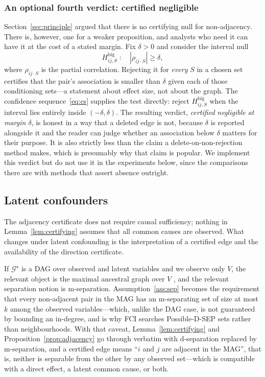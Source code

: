 \documentclass[pdflatex,sn-apa]{sn-jnl}
\theoremstyle{thmstyleone}%
\theoremstyle{thmstyletwo}%
\theoremstyle{thmstylethree}%
\newcommand{\Gstar}{\mathcal{G}^{\star}}
\begin{document}
\subsubsection{An optional fourth verdict: certified negligible}
\label{sec:negligible}

Section~\ref{sec:principle} argued that there is no certifying null for
non-adjacency. There is, however, one for a weaker proposition, and analysts
who need it can have it at the cost of a stated margin. Fix $\delta > 0$ and
consider the interval null
\begin{equation}\label{eq:ropenull}
H^{\mathrm{big}}_{ij,S} \;:\quad |\rho_{ij \cdot S}| \ge \delta ,
\end{equation}
where $\rho_{ij\cdot S}$ is the partial correlation. Rejecting it for
\emph{every} $S$ in a chosen set certifies that the pair's association is
smaller than $\delta$ given each of those conditioning sets---a statement
about effect size, not about the graph. The confidence
sequence~\eqref{eq:cs} supplies the test directly: reject $H^{\mathrm{big}}_{ij,S}$
when the interval lies entirely inside $(-\delta, \delta)$. The resulting verdict, \emph{certified
negligible at margin $\delta$}, is honest in a way that a deleted edge is not,
because $\delta$ is reported alongside it and the reader can judge whether an
association below $\delta$ matters for their purpose. It is also strictly less
than the claim a delete-on-non-rejection method makes, which is presumably why
that claim is popular. We implement this verdict but do not use it in the
experiments below, since the comparisons there are with methods that assert
absence outright.

\subsection{Latent confounders}\label{sec:latent}

The adjacency certificate does not require causal sufficiency; nothing in
Lemma~\ref{lem:certifying} assumes that all common causes are observed.
What changes under latent confounding is the interpretation of a certified
edge and the availability of the direction certificate.

If $\Gstar$ is a DAG over observed and latent variables and we observe only
$V$, the relevant object is the maximal ancestral graph over $V$
\citep{richardson2002ancestral}, and the relevant separation notion is
m-separation. Assumption~\ref{ass:sep} becomes the requirement that every
non-adjacent pair in the MAG has an m-separating set of size at most $k$ among
the observed variables---which, unlike the DAG case, is not guaranteed by
bounding an in-degree, and is why FCI searches Possible-D-SEP sets rather than
neighbourhoods. With that caveat, Lemma~\ref{lem:certifying} and
Proposition~\ref{prop:adjacency} go through verbatim with d-separation
replaced by m-separation, and a certified edge means ``$i$ and $j$ are
adjacent in the MAG'', that is, neither is separable from the other by any
observed set---which is compatible with a direct effect, a latent common
cause, or both.
\end{document}
